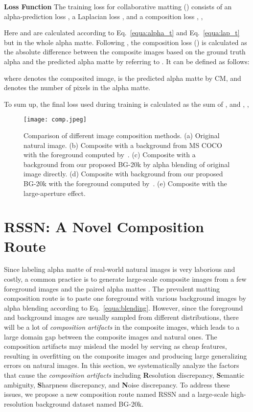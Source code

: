 \documentclass[twocolumn]{svjour3}
\begin{document}
\textbf{Loss Function} The training loss for collaborative matting () consists of an alpha-prediction loss , a Laplacian loss , and a composition loss , ,

Here  and  are calculated according to Eq.~\eqref{equa:alpha_t} and Eq.~\eqref{equa:lap_t} but in the whole alpha matte. Following \citep{xu2017deep}, the composition loss () is calculated as the absolute difference between the composite images based on the ground truth alpha and the predicted alpha matte by referring to \citep{levin2007closed}. It can be defined as follows:

where  denotes the composited image,  is the predicted alpha matte by CM, and  denotes the number of pixels in the alpha matte.

To sum up, the final loss used during training is calculated as the sum of ,  and , ,



\begin{figure*}[!t]
    \centering
    \texttt{[image: comp.jpeg]}
     \caption{Comparison of different image composition methods. (a) Original natural image. (b) Composite with a background from MS COCO~\citep{lin2014microsoft} with the foreground computed by~\citep{levin2007closed}. (c) Composite with a background from our proposed BG-20k by alpha blending of original image directly. (d) Composite with background from our proposed BG-20k with the foreground computed by~\citep{levin2007closed}. (e) Composite with the large-aperture effect.}
    \label{fig:composite}
\end{figure*}


\section{RSSN: A Novel Composition Route}
 
Since labeling alpha matte of real-world natural images is very laborious and costly, a common practice is to generate large-scale composite images from a few foreground images and the paired alpha mattes \citep{xu2017deep}. The prevalent matting composition route is to paste one foreground with various background images by alpha blending according to Eq.~\eqref{equa:blending}. However, since the foreground and background images are usually sampled from different distributions, there will be a lot of \emph{composition artifacts} in the composite images, which leads to a large domain gap between the composite images and natural ones. The composition artifacts may mislead the model by serving as cheap features, resulting in overfitting on the composite images and producing large generalizing errors on natural images. In this section, we systematically analyze the factors that cause the \emph{composition artifacts} including \textbf{R}esolution discrepancy, \textbf{S}emantic ambiguity, \textbf{S}harpness discrepancy, and \textbf{N}oise discrepancy. To address these issues, we propose a new composition route named RSSN and a large-scale high-resolution background dataset named BG-20k.
\end{document}
